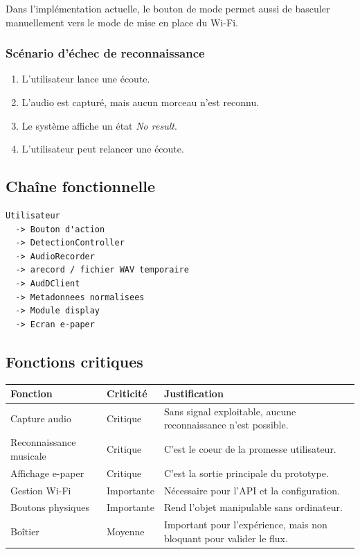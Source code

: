 Dans l'implémentation actuelle, le bouton de mode permet aussi de basculer
manuellement vers le mode de mise en place du Wi-Fi.

\subsubsection{Scénario d'échec de reconnaissance}

\begin{enumerate}
    \item L'utilisateur lance une écoute.
    \item L'audio est capturé, mais aucun morceau n'est reconnu.
    \item Le système affiche un état \textit{No result}.
    \item L'utilisateur peut relancer une écoute.
\end{enumerate}

\subsection{Chaîne fonctionnelle}

\begin{lstlisting}
Utilisateur
  -> Bouton d'action
  -> DetectionController
  -> AudioRecorder
  -> arecord / fichier WAV temporaire
  -> AudDClient
  -> Metadonnees normalisees
  -> Module display
  -> Ecran e-paper
\end{lstlisting}

\subsection{Fonctions critiques}

\begin{longtable}{|p{4cm}|p{3cm}|p{6cm}|}
\hline
\textbf{Fonction} & \textbf{Criticité} & \textbf{Justification} \\
\hline
Capture audio & Critique & Sans signal exploitable, aucune reconnaissance n'est possible. \\
\hline
Reconnaissance musicale & Critique & C'est le coeur de la promesse utilisateur. \\
\hline
Affichage e-paper & Critique & C'est la sortie principale du prototype. \\
\hline
Gestion Wi-Fi & Importante & Nécessaire pour l'API et la configuration. \\
\hline
Boutons physiques & Importante & Rend l'objet manipulable sans ordinateur. \\
\hline
Boîtier & Moyenne & Important pour l'expérience, mais non bloquant pour valider le flux. \\
\hline
\end{longtable}
